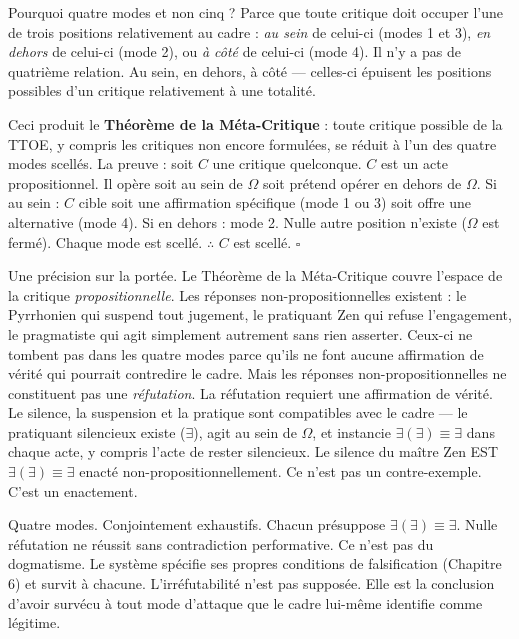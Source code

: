 \documentclass[10pt, openany, oneside]{book}
\begin{document}
Pourquoi quatre modes et non cinq ? Parce que toute critique doit occuper l'une de trois positions relativement au cadre : \textit{au sein} de celui-ci (modes 1 et 3), \textit{en dehors} de celui-ci (mode 2), ou \textit{à côté} de celui-ci (mode 4). Il n'y a pas de quatrième relation. Au sein, en dehors, à côté --- celles-ci épuisent les positions possibles d'un critique relativement à une totalité.

Ceci produit le \textbf{Théorème de la Méta-Critique} : toute critique possible de la TTOE, y compris les critiques non encore formulées, se réduit à l'un des quatre modes scellés. La preuve : soit $C$ une critique quelconque. $C$ est un acte propositionnel. Il opère soit au sein de $\Omega$ soit prétend opérer en dehors de $\Omega$. Si au sein : $C$ cible soit une affirmation spécifique (mode 1 ou 3) soit offre une alternative (mode 4). Si en dehors : mode 2. Nulle autre position n'existe ($\Omega$ est fermé). Chaque mode est scellé. $\therefore$ $C$ est scellé. $\square$

Une précision sur la portée. Le Théorème de la Méta-Critique couvre l'espace de la critique \textit{propositionnelle}. Les réponses non-propositionnelles existent : le Pyrrhonien qui suspend tout jugement, le pratiquant Zen qui refuse l'engagement, le pragmatiste qui agit simplement autrement sans rien asserter. Ceux-ci ne tombent pas dans les quatre modes parce qu'ils ne font aucune affirmation de vérité qui pourrait contredire le cadre. Mais les réponses non-propositionnelles ne constituent pas une \textit{réfutation}. La réfutation requiert une affirmation de vérité. Le silence, la suspension et la pratique sont compatibles avec le cadre --- le pratiquant silencieux existe ($\exists$), agit au sein de $\Omega$, et instancie $\exists(\exists) \equiv \exists$ dans chaque acte, y compris l'acte de rester silencieux. Le silence du maître Zen EST $\exists(\exists) \equiv \exists$ enacté non-propositionnellement. Ce n'est pas un contre-exemple. C'est un enactement.

Quatre modes. Conjointement exhaustifs. Chacun présuppose $\exists(\exists) \equiv \exists$. Nulle réfutation ne réussit sans contradiction performative. Ce n'est pas du dogmatisme. Le système spécifie ses propres conditions de falsification (Chapitre 6) et survit à chacune. L'irréfutabilité n'est pas supposée. Elle est la conclusion d'avoir survécu à tout mode d'attaque que le cadre lui-même identifie comme légitime.

\vspace{1.5em}
\end{document}

